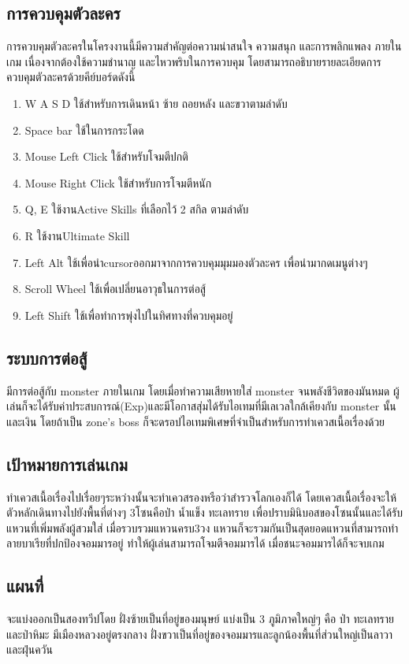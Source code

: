 \subsection{การควบคุมตัวละคร}
การควบคุมตัวละครในโครงงานนี้มีความสำคัญต่อความน่าสนใจ ความสนุก และการพลิกแพลง
ภายในเกม เนื่องจากต้องใช้ความชำนาญ และไหวพริบในการควบคุม โดยสามารถอธิบายรายละเอียดการ
ควบคุมตัวละครด้วยคีย์บอร์ดดังนี้
\begin{enumerate}
\item W A S D ใช้สำหรับการเดินหน้า ซ้าย ถอยหลัง และขวาตามลำดับ
\item Space bar ใช้ในการกระโดด
\item Mouse Left Click ใช้สำหรับโจมตีปกติ
\item Mouse Right Click ใช้สำหรับการโจมตีหนัก
\item Q, E ใช้งานActive Skills ที่เลือกไว้ 2 สกิล ตามลำดับ
\item R ใช้งานUltimate Skill
\item Left Alt ใช้เพื่อนำcursorออกมาจากการควบคุมมุมมองตัวละคร เพื่อนำมากดเมนูต่างๆ
\item Scroll Wheel ใช้เพื่อเปลี่ยนอาวุธในการต่อสู้
\item Left Shift ใช้เพื่อทำการพุ่งไปในทิศทางที่ควบคุมอยู่
\end{enumerate}

\subsection{ระบบการต่อสู้}
มีการต่อสู้กับ monster ภายในเกม โดยเมื่อทำความเสียหายใส่ monster จนพลังชีวิตของมันหมด ผู้เล่นก็จะได้รับค่าประสบการณ์(Exp)และมีโอกาสสุ่มได้รับไอเทมที่มีเลเวลใกล้เคียงกับ monster นั้นและเงิน โดยถ้าเป็น zone’s boss ก็จะดรอปไอเทมพิเศษที่จำเป็นสำหรับการทำเควสเนื้อเรื่องด้วย
\subsection{เป้าหมายการเล่นเกม}
ทำเควสเนื้อเรื่องไปเรื่อยๆระหว่างนั้นจะทำเควสรองหรือว่าสำรวจโลกเองก็ได้
โดยเควสเนื้อเรื่องจะให้ตัวหลักเดินทางไปยังพื้นที่ต่างๆ 3โซนคือป่า น้ำแข็ง ทะเลทราย เพื่อปราบมินิบอสของโซนนั้นและได้รับแหวนที่เพิ่มพลังผู้สวมใส่ เมื่อรวบรวมแหวนครบ3วง แหวนก็จะรวมกันเป็นสุดยอดแหวนที่สามารถทำลายบาเรียที่ปกป้องจอมมารอยู่ ทำให้ผู้เล่นสามารถโจมตีจอมมารได้ เมื่อชนะจอมมารได้ก็จะจบเกม

\subsection{แผนที่}
จะแบ่งออกเป็นสองทวีปโดย ฝั่งซ้ายเป็นที่อยู่ของมนุษย์ แบ่งเป็น 3 ภูมิภาคใหญ่ๆ คือ ป่า ทะเลทราย และป่าหิมะ มีเมืองหลวงอยู่ตรงกลาง ฝั่งขวาเป็นที่อยู่ของจอมมารและลูกน้องพื้นที่ส่วนใหญ่เป็นลาวาและฝุ่นควัน



  
  

